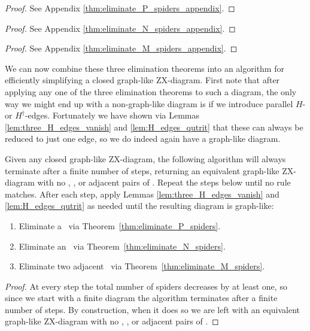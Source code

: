 \begin{theorem}\label{thm:eliminate_P_spiders}
	\eliminatePSpidersStatement
	\begin{proof}
		See Appendix \ref{thm:eliminate_P_spiders_appendix}.
	\end{proof}
\end{theorem}

\begin{theorem}\label{thm:eliminate_N_spiders}
	\eliminateNSpidersStatement
	\begin{proof}
		See Appendix \ref{thm:eliminate_N_spiders_appendix}.
	\end{proof}
\end{theorem}

\begin{theorem}\label{thm:eliminate_M_spiders}
	\eliminateMSpidersStatement
	\begin{proof}
		See Appendix \ref{thm:eliminate_M_spiders_appendix}.
	\end{proof}
\end{theorem}

We can now combine these three elimination theorems into an algorithm for efficiently simplifying a closed graph-like ZX-diagram. First note that after applying any one of the three elimination theorems to such a diagram, the only way we might end up with a non-graph-like diagram is if we introduce parallel $H$- or $H^\dagger$-edges. Fortunately we have shown via Lemmas \ref{lem:three_H_edges_vanish} and \ref{lem:H_edges_qutrit} that these can always be reduced to just one edge, so we do indeed again have a graph-like diagram.

\begin{theorem}\label{thm:simplification_algorithm_works}
	Given any closed graph-like ZX-diagram, the following algorithm will always terminate after a finite number of steps, returning an equivalent graph-like ZX-diagram with no \Nspiders, \Pspiders, or adjacent pairs of \Mspiders. Repeat the steps below until no rule matches. After each step, apply Lemmas \ref{lem:three_H_edges_vanish} and \ref{lem:H_edges_qutrit} as needed until the resulting diagram is graph-like:
	\begin{enumerate}
		\item Eliminate a \Pspider\ via Theorem~\ref{thm:eliminate_P_spiders}.
		\item Eliminate an \Nspider\ via Theorem~\ref{thm:eliminate_N_spiders}.
		\item Eliminate two adjacent \Mspiders\ via Theorem~\ref{thm:eliminate_M_spiders}.
	\end{enumerate}
	\begin{proof}
		At every step the total number of spiders decreases by at least one, so since we start with a finite diagram the algorithm terminates after a finite number of steps. By construction, when it does so we are left with an equivalent graph-like ZX-diagram with no \Nspiders, \Pspiders, or adjacent pairs of \Mspiders.
	\end{proof}
\end{theorem}

